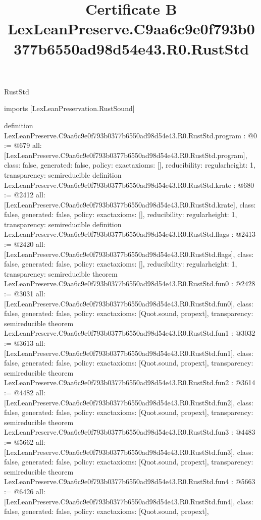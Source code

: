 \begin{lexlean}{RustStd}
\title{Certificate B LexLeanPreserve.C9aa6c9e0f793b0377b6550ad98d54e43.R0.RustStd}
\begin{coremodule}
imports [LexLeanPreservation.RustSound]

definition LexLeanPreserve.C9aa6c9e0f793b0377b6550ad98d54e43.R0.RustStd.program : @0 := @679 {
  all: [LexLeanPreserve.C9aa6c9e0f793b0377b6550ad98d54e43.R0.RustStd.program],
  class: false,
  generated: false,
  policy: exact{axioms: []},
  reducibility: regular{height: 1},
  transparency: semireducible
}
definition LexLeanPreserve.C9aa6c9e0f793b0377b6550ad98d54e43.R0.RustStd.krate : @680 := @2412 {
  all: [LexLeanPreserve.C9aa6c9e0f793b0377b6550ad98d54e43.R0.RustStd.krate],
  class: false,
  generated: false,
  policy: exact{axioms: []},
  reducibility: regular{height: 1},
  transparency: semireducible
}
definition LexLeanPreserve.C9aa6c9e0f793b0377b6550ad98d54e43.R0.RustStd.flags : @2413 := @2420 {
  all: [LexLeanPreserve.C9aa6c9e0f793b0377b6550ad98d54e43.R0.RustStd.flags],
  class: false,
  generated: false,
  policy: exact{axioms: []},
  reducibility: regular{height: 1},
  transparency: semireducible
}
theorem LexLeanPreserve.C9aa6c9e0f793b0377b6550ad98d54e43.R0.RustStd.fun0 : @2428 := @3031 {
  all: [LexLeanPreserve.C9aa6c9e0f793b0377b6550ad98d54e43.R0.RustStd.fun0],
  class: false,
  generated: false,
  policy: exact{axioms: [Quot.sound, propext]},
  transparency: semireducible
}
theorem LexLeanPreserve.C9aa6c9e0f793b0377b6550ad98d54e43.R0.RustStd.fun1 : @3032 := @3613 {
  all: [LexLeanPreserve.C9aa6c9e0f793b0377b6550ad98d54e43.R0.RustStd.fun1],
  class: false,
  generated: false,
  policy: exact{axioms: [Quot.sound, propext]},
  transparency: semireducible
}
theorem LexLeanPreserve.C9aa6c9e0f793b0377b6550ad98d54e43.R0.RustStd.fun2 : @3614 := @4482 {
  all: [LexLeanPreserve.C9aa6c9e0f793b0377b6550ad98d54e43.R0.RustStd.fun2],
  class: false,
  generated: false,
  policy: exact{axioms: [Quot.sound, propext]},
  transparency: semireducible
}
theorem LexLeanPreserve.C9aa6c9e0f793b0377b6550ad98d54e43.R0.RustStd.fun3 : @4483 := @5662 {
  all: [LexLeanPreserve.C9aa6c9e0f793b0377b6550ad98d54e43.R0.RustStd.fun3],
  class: false,
  generated: false,
  policy: exact{axioms: [Quot.sound, propext]},
  transparency: semireducible
}
theorem LexLeanPreserve.C9aa6c9e0f793b0377b6550ad98d54e43.R0.RustStd.fun4 : @5663 := @6426 {
  all: [LexLeanPreserve.C9aa6c9e0f793b0377b6550ad98d54e43.R0.RustStd.fun4],
  class: false,
  generated: false,
  policy: exact{axioms: [Quot.sound, propext]},
}
\end{coremodule}
\end{lexlean}
